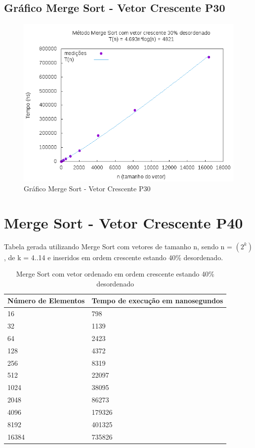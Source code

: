 \documentclass[12pt,a4paper,twoside]{report}
\begin{document}
\subsection{Gráfico Merge Sort - Vetor Crescente P30}
\begin{figure}[H]
    \centering
    \includegraphics[width=0.7\linewidth]{graficos/MergeSort/vIntCrescenteP30/vIntCrescenteP30.png}
  \caption{Gráfico Merge Sort - Vetor Crescente P30}
\end{figure}

\section{Merge Sort - Vetor Crescente P40}
Tabela gerada utilizando Merge Sort com vetores de tamanho n, sendo n = $(2^k)$, de k = 4..14 e inseridos em ordem crescente estando 40\% desordenado.
\begin{table}[H]
\centering
\caption{Merge Sort com vetor ordenado em ordem crescente estando 40\% desordenado}
\label{my-label}
\begin{tabular}{|l|l|}
\hline
\multicolumn{1}{|c|}{\textbf{Número de Elementos}} & \multicolumn{1}{c|}{\textbf{Tempo de execução em nanosegundos}} \\ \hline
16 & 798 \\ \hline
32 & 1139 \\ \hline
64 & 2423 \\ \hline
128 & 4372 \\ \hline
256 & 8319 \\ \hline
512 & 22097 \\ \hline
1024 & 38095 \\ \hline
2048 & 86273 \\ \hline
4096 & 179326 \\ \hline
8192 & 401325 \\ \hline
16384 & 735826 \\ \hline
\end{tabular}
\end{table}
\end{document}

